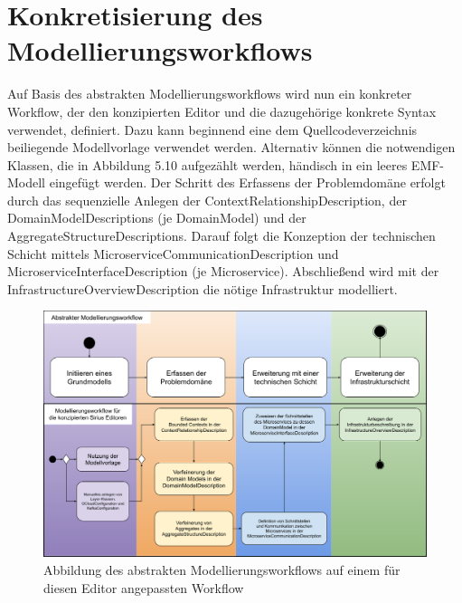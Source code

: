 \newpage

\section{Konkretisierung des Modellierungsworkflows}

Auf Basis des abstrakten Modellierungsworkflows wird nun ein konkreter Workflow, der den konzipierten Editor und die dazugehörige konkrete Syntax verwendet, definiert. Dazu kann beginnend eine dem Quellcodeverzeichnis beiliegende Modellvorlage \cite{mustermodell} verwendet werden. Alternativ können die notwendigen Klassen, die in Abbildung 5.10 aufgezählt werden, händisch in ein leeres EMF-Modell eingefügt werden. Der Schritt des Erfassens der Problemdomäne erfolgt durch das sequenzielle Anlegen der ContextRelationshipDescription, der DomainModelDescriptions (je DomainModel) und der AggregateStructureDescriptions. Darauf folgt die Konzeption der technischen Schicht mittels MicroserviceCommunicationDescription und MicroserviceInterfaceDescription (je Microservice). Abschließend wird mit der InfrastructureOverviewDescription die nötige Infrastruktur modelliert.

\begin{figure}[ht]
\centering
\includegraphics[width=\textwidth]{bilder/k5/workflow2.png}
\caption{Abbildung des abstrakten Modellierungsworkflows auf einem für diesen Editor angepassten Workflow}
\end{figure}
